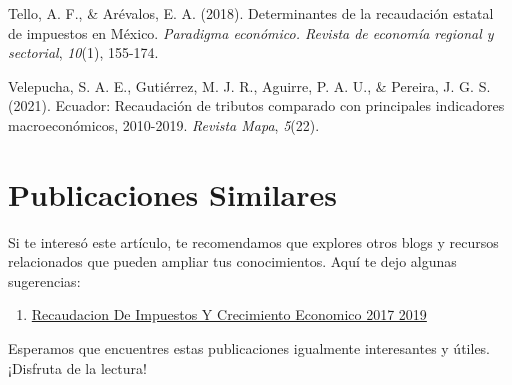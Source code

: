 \documentclass[
  jou,
  floatsintext,
  longtable,
  a4paper,
  nolmodern,
  notxfonts,
  notimes,
  12pt,
  colorlinks=true,linkcolor=blue,citecolor=blue,urlcolor=blue]{apa7}
\providecommand{\tightlist}{%
  \setlength{\itemsep}{0pt}\setlength{\parskip}{0pt}}
\newlength{\cslhangindent}
\newenvironment{CSLReferences}[2] %
 {\begin{list}{}{%
  \setlength{\itemindent}{0pt}
  \setlength{\leftmargin}{0pt}
  \setlength{\parsep}{0pt}
  \ifodd #1
   \setlength{\leftmargin}{\cslhangindent}
   \setlength{\itemindent}{-1\cslhangindent}
  \fi
  \setlength{\itemsep}{#2\baselineskip}}}
 {\end{list}}
\begin{document}
\begin{CSLReferences}{1}{0}
Tello, A. F., \& Arévalos, E. A. (2018). Determinantes de la recaudación
estatal de impuestos en México. \emph{Paradigma económico. Revista de
economía regional y sectorial}, \emph{10}(1), 155-174.

Velepucha, S. A. E., Gutiérrez, M. J. R., Aguirre, P. A. U., \& Pereira,
J. G. S. (2021). Ecuador: Recaudación de tributos comparado con
principales indicadores macroeconómicos, 2010-2019. \emph{Revista Mapa},
\emph{5}(22).

\end{CSLReferences}

\appendix

\section{Publicaciones Similares}\label{apx-publicaciones-similares}

\setlength{\parindent}{1em}

Si te interesó este artículo, te recomendamos que explores otros blogs y
recursos relacionados que pueden ampliar tus conocimientos. Aquí te dejo
algunas sugerencias:

\begin{enumerate}
\def\labelenumi{\arabic{enumi}.}
\tightlist
\item
  \href{https://epsilon-y-beta.netlify.app/00-econometria-general/2022-01-11-recaudacion-de-impuestos-y-crecimiento-economico-2017-2019/index.pdf}{}
  \href{https://epsilon-y-beta.netlify.app/00-econometria-general/2022-01-11-recaudacion-de-impuestos-y-crecimiento-economico-2017-2019}{Recaudacion
  De Impuestos Y Crecimiento Economico 2017 2019}
\end{enumerate}

Esperamos que encuentres estas publicaciones igualmente interesantes y
útiles. ¡Disfruta de la lectura!
\end{document}
